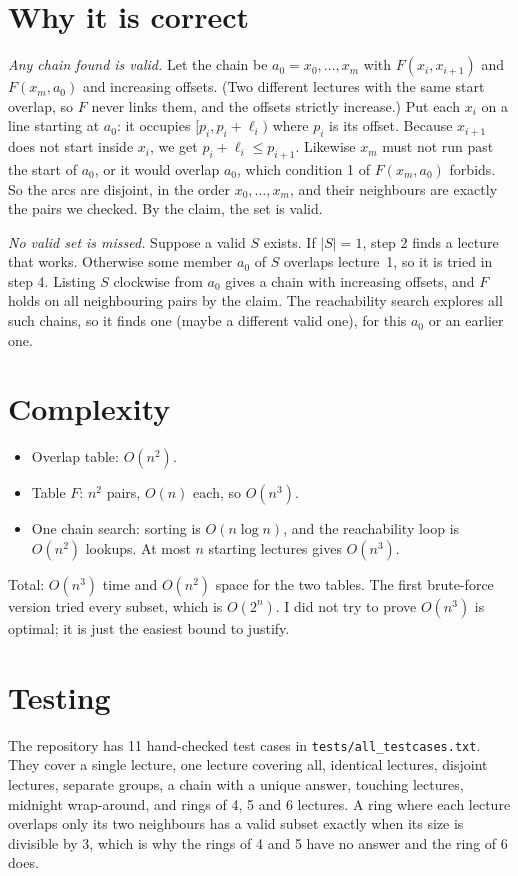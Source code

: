 \documentclass[11pt,a4paper]{article}
\begin{document}
\section{Why it is correct}

\emph{Any chain found is valid.} Let the chain be $a_0=x_0,\dots,x_m$ with
$F(x_i,x_{i+1})$ and $F(x_m,a_0)$ and increasing offsets. (Two different lectures
with the same start overlap, so $F$ never links them, and the offsets strictly
increase.) Put each $x_i$ on a line starting at $a_0$: it occupies
$[p_i,p_i+\ell_i)$ where $p_i$ is its offset. Because $x_{i+1}$ does not start
inside $x_i$, we get $p_i+\ell_i\le p_{i+1}$. Likewise $x_m$ must not run past the
start of $a_0$, or it would overlap $a_0$, which condition 1 of $F(x_m,a_0)$
forbids. So the arcs are disjoint, in the order $x_0,\dots,x_m$, and their
neighbours are exactly the pairs we checked. By the claim, the set is valid.

\emph{No valid set is missed.} Suppose a valid $S$ exists. If $|S|=1$, step 2
finds a lecture that works. Otherwise some member $a_0$ of $S$ overlaps
lecture~1, so it is tried in step 4. Listing $S$ clockwise from $a_0$ gives a
chain with increasing offsets, and $F$ holds on all neighbouring pairs by the
claim. The reachability search explores all such chains, so it finds one (maybe a
different valid one), for this $a_0$ or an earlier one.

\section{Complexity}

\begin{itemize}
  \item Overlap table: $O(n^2)$.
  \item Table $F$: $n^2$ pairs, $O(n)$ each, so $O(n^3)$.
  \item One chain search: sorting is $O(n\log n)$, and the reachability loop is
  $O(n^2)$ lookups. At most $n$ starting lectures gives $O(n^3)$.
\end{itemize}
Total: $O(n^3)$ time and $O(n^2)$ space for the two tables. The first brute-force
version tried every subset, which is $O(2^n)$. I did not try to prove
$O(n^3)$ is optimal; it is just the easiest bound to justify.

\section{Testing}

The repository has 11 hand-checked test cases in \texttt{tests/all\_testcases.txt}.
They cover a single lecture, one lecture covering all, identical lectures,
disjoint lectures, separate groups, a chain with a unique answer, touching
lectures, midnight wrap-around, and rings of 4, 5 and 6 lectures. A ring where
each lecture overlaps only its two neighbours has a valid subset exactly when
its size is divisible by 3, which is why the rings of 4 and 5 have no answer and
the ring of 6 does.
\end{document}
